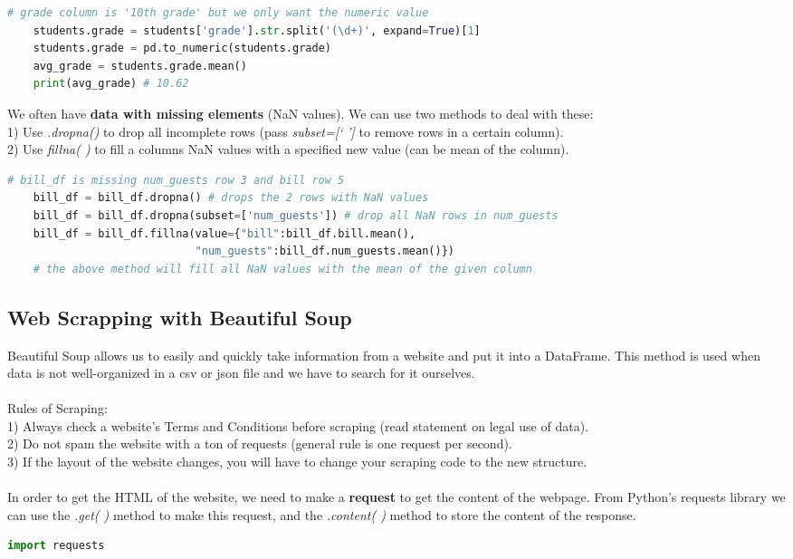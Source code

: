 \documentclass[11pt, a4paper]{article}
\begin{document}
\begin{spacing}{1.1}
\begin{lstlisting}[language=Python]
	# grade column is '10th grade' but we only want the numeric value
	students.grade = students['grade'].str.split('(\d+)', expand=True)[1]
	students.grade = pd.to_numeric(students.grade)
	avg_grade = students.grade.mean()
	print(avg_grade) # 10.62 \end{lstlisting}\vspace*{1mm}
	We often have \textbf{data with missing elements} (NaN values). We can use two methods to deal with these: \\
	1) Use \textit{.dropna()} to drop all incomplete rows (pass \textit{subset=[` ']} to remove rows in a certain column). \\
	2) Use \textit{fillna( )} to fill a columns NaN values with a specified new value (can be mean of the column).
	\begin{lstlisting}[language=Python]
	# bill_df is missing num_guests row 3 and bill row 5
	bill_df = bill_df.dropna() # drops the 2 rows with NaN values
	bill_df = bill_df.dropna(subset=['num_guests']) # drop all NaN rows in num_guests
	bill_df = bill_df.fillna(value={"bill":bill_df.bill.mean(), 
	                         "num_guests":bill_df.num_guests.mean()})
	# the above method will fill all NaN values with the mean of the given column \end{lstlisting}\vspace*{1mm}
	
	\subsection{Web Scrapping with Beautiful Soup}
	Beautiful Soup allows us to easily and quickly take information from a website and put it into a DataFrame. This method is used when data is not well-organized in a csv or json file and we have to search for it ourselves. \\~\\
	Rules of Scraping: \\
	1) Always check a website’s Terms and Conditions before scraping (read statement on legal use of data). \\
	2) Do not spam the website with a ton of requests (general rule is one request per second). \\
	3) If the layout of the website changes, you will have to change your scraping code to the new structure. \\~\\
	In order to get the HTML of the website, we need to make a \textbf{request} to get the content of the webpage. From Python's requests library we can use the \textit{.get( )} method to make this request, and the \textit{.content( )} method to store the content of the response.
	\begin{lstlisting}[language=Python]
	import requests
	

\end{lstlisting}
\end{spacing}
\end{document}
